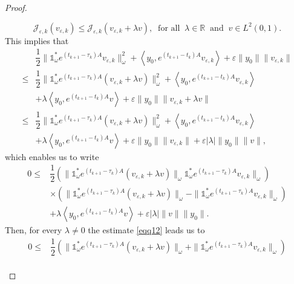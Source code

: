 \documentclass[sn-mathphys]{sn-jnl}
\begin{document}
\begin{proof}
\begin{enumerate}
    \[\mathcal{J}_{\varepsilon,k}(v_{\varepsilon,k}) \leq \mathcal{J}_{\varepsilon,k}(v_{\varepsilon,k}+ \lambda v), \;\;\text{for all}\;\;\lambda\in \mathbb{R}\;\;\text{and}\;\;v\in L^2(0,1).\]
    This implies that
    \begin{align*}
        &\dfrac{1}{2} \| \mathds{1}_{\omega}^{*} e^{(t_{k+1}-\tau_k)A} v_{\varepsilon,k}\|^2_{\omega} + \left\langle y_0, e^{(t_{k+1}-t_k)A} v_{\varepsilon,k} \right\rangle + \varepsilon \|y_0\|\| v_{\varepsilon,k}\|\\
        \leq &\dfrac{1}{2} \| \mathds{1}_{\omega}^{*} e^{(t_{k+1}-\tau_k)A} (v_{\varepsilon,k} + \lambda v) \|^2_{\omega} + \left\langle y_0, e^{(t_{k+1}-t_k)A} v_{\varepsilon,k} \right\rangle \\
        &+ \lambda \left\langle y_0, e^{(t_{k+1}-t_k)A} v \right\rangle + \varepsilon \|y_0\|\| v_{\varepsilon,k} + \lambda v\|\\
        \leq &\dfrac{1}{2} \| \mathds{1}_{\omega}^{*} e^{(t_{k+1}-\tau_k)A} (v_{\varepsilon,k} + \lambda v) \|^2_{\omega} + \left\langle y_0, e^{(t_{k+1}-t_k)A} v_{\varepsilon,k} \right\rangle \\
        &+ \lambda \left\langle y_0, e^{(t_{k+1}-t_k)A} v \right\rangle + \varepsilon \|y_0\|\| v_{\varepsilon,k}\| + \varepsilon \left\lvert \lambda \right\rvert \|y_0\| \|v\|,
    \end{align*}
    which enables us to write
    \begin{equation}\label{eqq12}
        \begin{aligned}
        0\leq &\dfrac{1}{2} \left(\| \mathds{1}_{\omega}^{*} e^{(t_{k+1}-\tau_k)A} (v_{\varepsilon,k}+\lambda v)\|_{\omega} \mathds{1}_{\omega}^{*} e^{(t_{k+1}-\tau_k)A} v_{\varepsilon,k}\|_{\omega} \right)\nonumber\\
        &\times \left(\| \mathds{1}_{\omega}^{*} e^{(t_{k+1}-\tau_k)A} (v_{\varepsilon,k}+\lambda v)\|_{\omega} - \| \mathds{1}_{\omega}^{*} e^{(t_{k+1}-\tau_k)A} v_{\varepsilon,k}\|_{\omega}  \right)\nonumber\\
        &+ \lambda \left\langle y_0, e^{(t_{k+1}-t_k)A} v \right\rangle +  \varepsilon \left\lvert\lambda \right\rvert \|v\| \|y_0\|.
    \end{aligned}
    \end{equation}
    Then, for every $\lambda \neq 0$ the estimate \eqref{eqq12} leads us to
    \begin{align*}
        0\leq &\dfrac{1}{2} \left(\| \mathds{1}_{\omega}^{*} e^{(t_{k+1}-\tau_k)A} (v_{\varepsilon,k}+\lambda v)\|_{\omega} + \| \mathds{1}_{\omega}^{*} e^{(t_{k+1}-\tau_k)A} v_{\varepsilon,k}\|_{\omega} \right)\nonumber\\

\end{align*}
\end{enumerate}
\end{proof}
\end{document}
